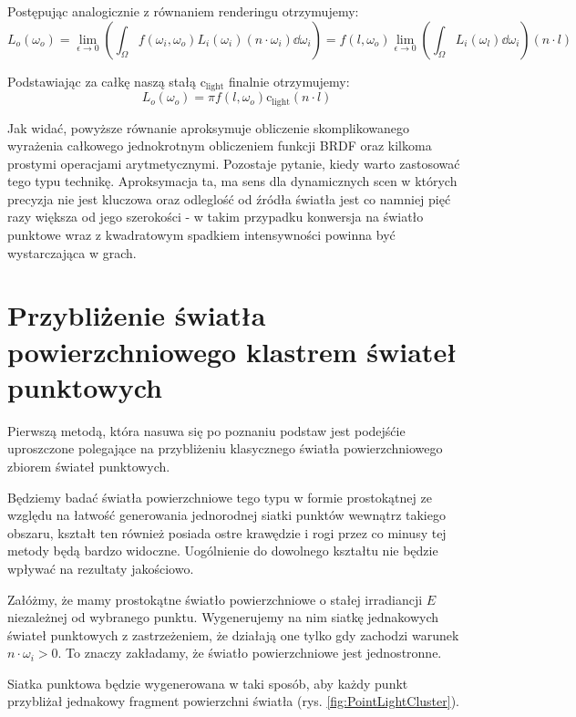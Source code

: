 \documentclass[../main.tex]{subfiles}
\newcommand{\clightcolor}{\text{c}_{\text{light}}}
\begin{document}
Postępując analogicznie z równaniem renderingu otrzymujemy:
\[
	L_o(\omega_o) = \lim_{\epsilon \rightarrow 0} \left(
		\int_{\Omega}{ f(\omega_i, \omega_o) L_i(\omega_i) (n \cdot \omega_i) } \dd\omega_i
	\right) =
	 f(l, \omega_o) \lim_{\epsilon \rightarrow 0} \left(
	 	\int_{\Omega} { L_i(\omega_l) } \dd\omega_i
	 \right)
	 (n \cdot l)
\]

Podstawiając za całkę naszą stałą $\clightcolor$ finalnie otrzymujemy:
\[
	L_o(\omega_o) = \pi f(l, \omega_o) \clightcolor (n \cdot l)
\]

Jak widać, powyższe równanie aproksymuje obliczenie skomplikowanego wyrażenia całkowego jednokrotnym obliczeniem funkcji BRDF oraz kilkoma prostymi operacjami arytmetycznymi. Pozostaje pytanie, kiedy warto zastosować tego typu technikę. Aproksymacja ta, ma sens dla dynamicznych scen w których precyzja nie jest kluczowa oraz odleglość od źródła światła jest co namniej pięć razy większa od jego szerokości \cite{RealTimeRendering2008}\cite{lambert_photometria} - w takim przypadku konwersja na światło punktowe wraz z kwadratowym spadkiem intensywności powinna być wystarczająca w grach.


\section{Przybliżenie światła powierzchniowego klastrem świateł punktowych}

Pierwszą metodą, która nasuwa się po poznaniu podstaw jest podejśćie uproszczone polegające na przybliżeniu klasycznego światła powierzchniowego zbiorem świateł punktowych.

Będziemy badać światła powierzchniowe tego typu w formie prostokątnej ze względu na łatwość generowania jednorodnej siatki punktów wewnątrz takiego obszaru, kształt ten również posiada ostre krawędzie i rogi przez co minusy tej metody będą bardzo widoczne. Uogólnienie do dowolnego kształtu nie będzie wpływać na rezultaty jakościowo.

Załóżmy, że mamy prostokątne światło powierzchniowe o stałej irradiancji $E$ niezależnej od wybranego punktu. Wygenerujemy na nim siatkę jednakowych świateł punktowych z zastrzeżeniem, że działają one tylko gdy zachodzi warunek $n \cdot \omega_i > 0 $. To znaczy zakładamy, że światło powierzchniowe jest jednostronne.

Siatka punktowa będzie wygenerowana w taki sposób, aby każdy punkt przybliżał jednakowy fragment powierzchni światła (rys. \ref{fig:PointLightCluster}).
\end{document}
